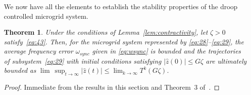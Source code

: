\documentclass[letter, 10pt, conference]{ieeeconf}
\newtheorem{theorem}{Theorem}[section]
\newcommand{\1}{\mathbf{1}}
\newcommand{\0}{\mathbf{0}}
\begin{document}
{We now have all the elements to establish the stability properties of
the droop controlled microgrid system.

\begin{theorem}
  Under the conditions of Lemma~\ref{lem:contractivity}, let $\zeta>0$
  satisfy~\eqref{eq:43}. Then, for the microgrid system represented by
  \eqref{eq:28}--\eqref{eq:29}, the average frequency error
  $\omega_{sync}$ given in \eqref{eq:wsync} is bounded and the
  trajectories of subsystem~\eqref{eq:29} with initial conditions
  satisfying $|\hat{z}(0)| \le G\zeta$ are ultimately bounded as $\lim
  \, \sup_{t\to \infty} |\hat{z}(t)| \le \lim_{k \to \infty}
  T^k(G\zeta)$.
\end{theorem}
\begin{proof}
  Immediate from the results in this section and Theorem~3 of~\cite{HaS13}.
\end{proof}







}
\end{document}
